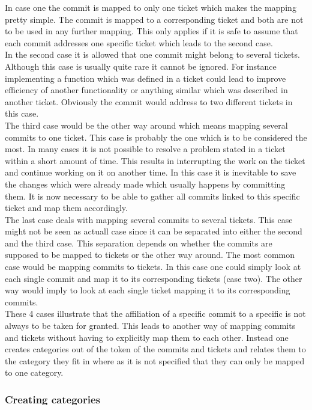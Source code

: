 In case one the commit is mapped to only one ticket which makes the mapping pretty simple.
The commit is mapped to a corresponding ticket and both are not to be used in any further mapping.
This only applies if it is safe to assume that each commit addresses one specific ticket which leads to the second case.\\
In the second case it is allowed that one commit might belong to several tickets.
Although this case is usually quite rare it cannot be ignored.
For instance implementing a function which was defined in a ticket could lead to improve efficiency of another functionality or anything similar which was described in another ticket.
Obviously the commit would address to two different tickets in this case.\\
The third case would be the other way around which means mapping several commits to one ticket.
This case is probably the one which is to be considered the most.
In many cases it is not possible to resolve a problem stated in a ticket within a short amount of time.
This results in interrupting the work on the ticket and continue working on it on another time.
In this case it is inevitable to save the changes which were already made which usually happens by committing them.
It is now necessary to be able to gather all commits linked to this specific ticket and map them accordingly.\\
The last case deals with mapping several commits to several tickets.
This case might not be seen as actuall case since it can be separated into either the second and the third case.
This separation depends on whether the commits are supposed to be mapped to tickets or the other way around.
The most common case would be mapping commits to tickets.
In this case one could simply look at each single commit and map it to its corresponding tickets (case two).
The other way would imply to look at each single ticket mapping it to its corresponding commits.\\
These 4 cases illustrate that the affiliation of a specific commit to a specific is not always to be taken for granted.
This leads to another way of mapping commits and tickets without having to explicitly map them to each other.
Instead one creates categories out of the token of the commits and tickets and relates them to the category they fit in where as it is not specified that they can only be mapped to one category.

\subsubsection{Creating categories}

